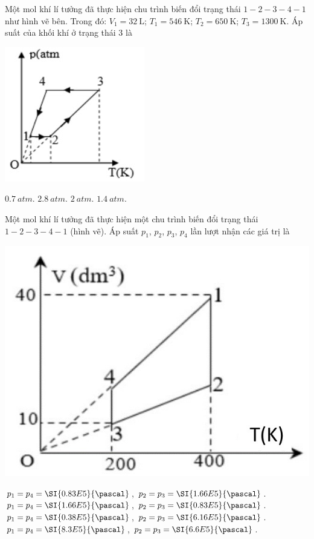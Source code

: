 \begin{ex}
Một mol khí lí tưởng đã thực hiện chu trình biến đổi trạng thái $1-2-3-4-1$ như hình vẽ bên. Trong đó: $V_1=\SI{32}{\liter}$; $T_1=\SI{546}{\kelvin}$; $T_2=\SI{650}{\kelvin}$; $T_3=\SI{1300}{\kelvin}$. Áp suất của khối khí ở trạng thái 3 là
\begin{center}
	\includegraphics[width=0.3\linewidth]{figs/VN12-Y24-PH-SYL-014P-7}
\end{center}
	
	\choice
	{$\SI{0.7}{atm}$.}
	{\True $\SI{2.8}{atm}$.}
	{$\SI{2}{atm}$.}
	{$\SI{1.4}{atm}$.}
\end{ex}
\begin{ex}
Một mol khí lí tưởng đã thực hiện một chu trình biến đổi trạng thái $1-2-3-4-1$ (hình vẽ). Áp suất $p_1$, $p_2$, $p_3$, $p_4$ lần lượt nhận các giá trị là
\begin{center}
	\includegraphics[width=0.35\linewidth]{figs/VN12-Y24-PH-SYL-014P-8}
\end{center}
	
	\choice
	{\True $p_1=p_4=\SI{0.83E5}{\pascal}$, $p_2=p_3=\SI{1.66E5}{\pascal}$.}
	{$p_1=p_4=\SI{1.66E5}{\pascal}$, $p_2=p_3=\SI{0.83E5}{\pascal}$.}
	{$p_1=p_4=\SI{0.38E5}{\pascal}$, $p_2=p_3=\SI{6.16E5}{\pascal}$.}
	{$p_1=p_4=\SI{8.3E5}{\pascal}$, $p_2=p_3=\SI{6.6E5}{\pascal}$.}
\end{ex}

